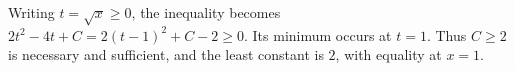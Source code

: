 Writing $t=\sqrt x\ge0$, the inequality becomes $2t^2-4t+C=2(t-1)^2+C-2\ge0$. Its minimum occurs at $t=1$. Thus $C\ge2$ is necessary and sufficient, and the least constant is $\boxed{2}$, with equality at $\boxed{x=1}$.
